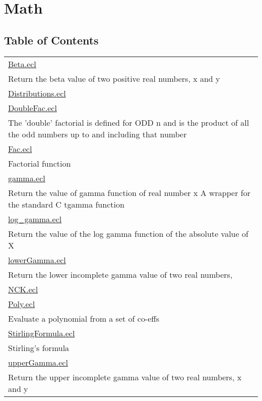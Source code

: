 \chapter*{Math}
\hypertarget{ecldoc:toc:ML_Core/Math}{}


\section*{Table of Contents}
{\renewcommand{\arraystretch}{1.5}
\begin{longtable}{|p{\textwidth}|}
\hline
\hyperlink{ecldoc:toc:ML_Core.Math.Beta}{Beta.ecl} \\
Return the beta value of two positive real numbers, x and y \\
\hline
\hyperlink{ecldoc:toc:ML_Core.Math.Distributions}{Distributions.ecl} \\
\hline
\hyperlink{ecldoc:toc:ML_Core.Math.DoubleFac}{DoubleFac.ecl} \\
The 'double' factorial is defined for ODD n and is the product of all the odd numbers up to and including that number \\
\hline
\hyperlink{ecldoc:toc:ML_Core.Math.Fac}{Fac.ecl} \\
Factorial function \\
\hline
\hyperlink{ecldoc:toc:ML_Core.Math.gamma}{gamma.ecl} \\
Return the value of gamma function of real number x A wrapper for the standard C tgamma function \\
\hline
\hyperlink{ecldoc:toc:ML_Core.Math.log_gamma}{log\_gamma.ecl} \\
Return the value of the log gamma function of the absolute value of X \\
\hline
\hyperlink{ecldoc:toc:ML_Core.Math.lowerGamma}{lowerGamma.ecl} \\
Return the lower incomplete gamma value of two real numbers, \\
\hline
\hyperlink{ecldoc:toc:ML_Core.Math.NCK}{NCK.ecl} \\
\hline
\hyperlink{ecldoc:toc:ML_Core.Math.Poly}{Poly.ecl} \\
Evaluate a polynomial from a set of co-effs \\
\hline
\hyperlink{ecldoc:toc:ML_Core.Math.StirlingFormula}{StirlingFormula.ecl} \\
Stirling's formula \\
\hline
\hyperlink{ecldoc:toc:ML_Core.Math.upperGamma}{upperGamma.ecl} \\
Return the upper incomplete gamma value of two real numbers, x and y \\
\hline
\end{longtable}
}












